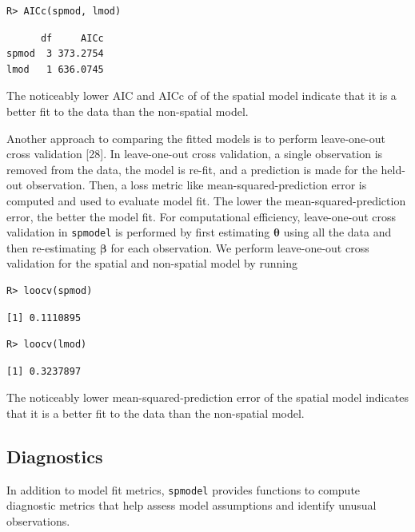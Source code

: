 \documentclass[10pt,letterpaper]{article}
\begin{document}
\begin{verbatim}
R> AICc(spmod, lmod)
\end{verbatim}

\begin{verbatim}
      df     AICc
spmod  3 373.2754
lmod   1 636.0745
\end{verbatim}

The noticeably lower AIC and AICc of of the spatial model indicate that
it is a better fit to the data than the non-spatial model.

Another approach to comparing the fitted models is to perform
leave-one-out cross validation {[}28{]}. In leave-one-out cross
validation, a single observation is removed from the data, the model is
re-fit, and a prediction is made for the held-out observation. Then, a
loss metric like mean-squared-prediction error is computed and used to
evaluate model fit. The lower the mean-squared-prediction error, the
better the model fit. For computational efficiency, leave-one-out cross
validation in \texttt{spmodel} is performed by first estimating
\(\boldsymbol{\theta}\) using all the data and then re-estimating
\(\boldsymbol{\beta}\) for each observation. We perform leave-one-out
cross validation for the spatial and non-spatial model by running

\begin{verbatim}
R> loocv(spmod)
\end{verbatim}

\begin{verbatim}
[1] 0.1110895
\end{verbatim}

\begin{verbatim}
R> loocv(lmod)
\end{verbatim}

\begin{verbatim}
[1] 0.3237897
\end{verbatim}

The noticeably lower mean-squared-prediction error of the spatial model
indicates that it is a better fit to the data than the non-spatial
model.

\hypertarget{diagnostics}{%
\subsection{Diagnostics}\label{diagnostics}}

In addition to model fit metrics, \texttt{spmodel} provides functions to
compute diagnostic metrics that help assess model assumptions and
identify unusual observations.
\end{document}
